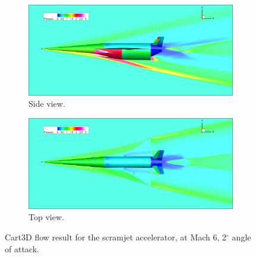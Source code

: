 \begin{figure}[ht]
\begin{subfigure}{.9\textwidth}
	\centering
	\includegraphics[width=0.9\linewidth]{figures/3_vehicle_design/CartSide}
	\caption{Side view.}
	\label{fig:CartSide}
\end{subfigure}

\begin{subfigure}{.9\textwidth}
	\centering
	\includegraphics[width=0.9\linewidth]{figures/3_vehicle_design/CartTop}
	\caption{Top view.}
	\label{fig:CartTop}
\end{subfigure}
\caption{Cart3D flow result for the scramjet accelerator, at Mach 6, 2$^\circ$ angle of attack.}
\label{fig:CartSPART}
\end{figure}

